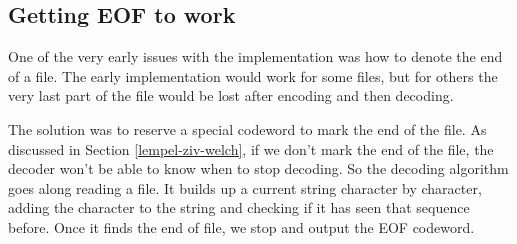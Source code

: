 \documentclass[12pt,twoside]{reedthesis}
\begin{document}
\hypertarget{getting-eof-to-work}{%
\subsection{Getting EOF to work}\label{getting-eof-to-work}}

One of the very early issues with the implementation was how to denote the end of a file. The early implementation would work for some files, but for others the very last part of the file would be lost after encoding and then decoding.

The solution was to reserve a special codeword to mark the end of the file.
As discussed in Section \ref{lempel-ziv-welch}, if we don't mark the end of the file, the decoder won't be able to know when to stop decoding. So the decoding algorithm goes along reading a file. It builds up a current string character by character, adding the character to the string and checking if it has seen that sequence before. Once it finds the end of file, we stop and output the EOF codeword.
\end{document}
